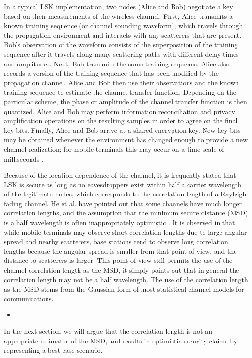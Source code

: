 \documentclass[12pt, titlepage]{article}
\begin{document}
In a typical LSK implementation, two nodes (Alice and Bob) negotiate a key based on their measurements of the wireless channel.  First, Alice transmits a known training sequence (or channel sounding waveform), which travels through the propagation environment and interacts with any scatterers that are present.  Bob's observation of the waveform consists of the superposition of the training sequence after it travels along many scattering paths with different delay times and amplitudes. Next, Bob transmits the same training sequence.  Alice also records a version of the training sequence that has been modified by the propagation channel.  Alice and Bob then use their observations and the known training sequence to estimate the channel transfer function.  Depending on the particular scheme, the phase \cite{hershey1995, hassan1996, sayeed2008} or amplitude \cite{azimisadjadi2007, mathur2008, ye2010, premnath2013, jana2013} of the channel transfer function is then quantized.  Alice and Bob may perform information reconciliation and privacy amplification operations on the resulting samples in order to agree on the final key bits.  Finally, Alice and Bob arrive at a shared encryption key.  New key bits may be obtained whenever the environment has changed enough to provide a new channel realization; for mobile terminals this may occur on a time scale of milliseconds \cite{hershey1995}.
 
Because of the location dependence of the channel, it is frequently stated that LSK is secure as long as no eavesdroppers exist within half a carrier wavelength of the legitimate nodes, which corresponds to the correlation length of a Rayleigh fading channel.  He et al. have pointed out that some channels have much longer correlation lengths, and the assumption that the minimum secure distance (MSD) is a half wavelength is often inappropriately optimistic \cite{he2013}.  It is observed in \cite{jakes1974} %
 that, while mobile terminals may observe short correlation lengths due to large angular spread and nearby scatterers, base stations tend to observe long correlation lengths because the angular spread is smaller from that point of view, and the distance to scatterers is larger.
This point of view still permits the use of the channel correlation length as the MSD, it simply points out that in general the correlation length may not be a half wavelength.  The use of the correlation length as the MSD stems from the Gaussian form of most statistical channel models for communications.
\begin{itemize}
\item 
\end{itemize}
In the next section, we will argue that the correlation length is not an appropriate estimator of the MSD, and results in optimistic security claims by representing a best-case scenario.
\end{document}

